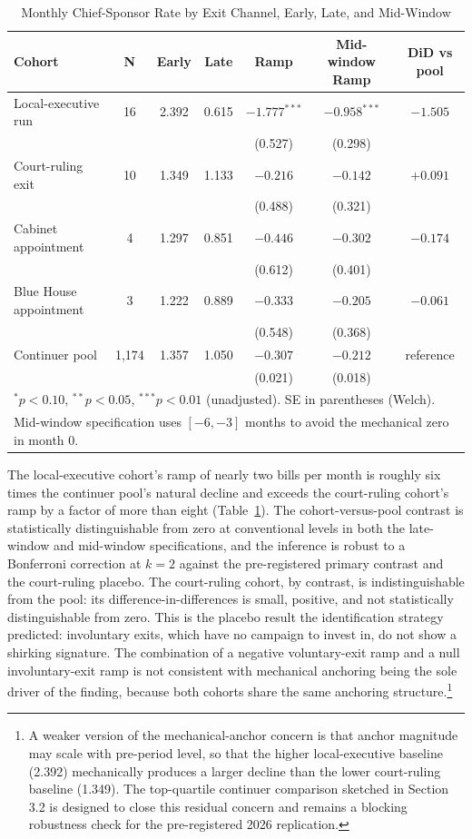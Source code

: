 \documentclass[11pt]{article}
\begin{document}
\begin{table}[H]
\centering
\caption{Monthly Chief-Sponsor Rate by Exit Channel, Early, Late, and Mid-Window}
\label{tab:main}
\begin{tabular}{lcccccc}
\toprule
Cohort & N & Early & Late & Ramp & Mid-window Ramp & DiD vs pool \\
\midrule
Local-executive run & 16 & 2.392 & 0.615 & $-1.777^{***}$ & $-0.958^{***}$ & $-1.505$ \\
 & & & & (0.527) & (0.298) & \\
Court-ruling exit & 10 & 1.349 & 1.133 & $-0.216$ & $-0.142$ & $+0.091$ \\
 & & & & (0.488) & (0.321) & \\
Cabinet appointment & 4 & 1.297 & 0.851 & $-0.446$ & $-0.302$ & $-0.174$ \\
 & & & & (0.612) & (0.401) & \\
Blue House appointment & 3 & 1.222 & 0.889 & $-0.333$ & $-0.205$ & $-0.061$ \\
 & & & & (0.548) & (0.368) & \\
\midrule
Continuer pool & 1{,}174 & 1.357 & 1.050 & $-0.307$ & $-0.212$ & reference \\
 & & & & (0.021) & (0.018) & \\
\bottomrule
\multicolumn{7}{l}{\footnotesize $^*p<0.10$, $^{**}p<0.05$, $^{***}p<0.01$ (unadjusted). SE in parentheses (Welch).} \\
\multicolumn{7}{l}{\footnotesize Mid-window specification uses $[-6,-3]$ months to avoid the mechanical zero in month 0.}
\end{tabular}
\end{table}

The local-executive cohort's ramp of nearly two bills per month is roughly six times the continuer pool's natural decline and exceeds the court-ruling cohort's ramp by a factor of more than eight (Table~\ref{tab:main}). The cohort-versus-pool contrast is statistically distinguishable from zero at conventional levels in both the late-window and mid-window specifications, and the inference is robust to a Bonferroni correction at $k=2$ against the pre-registered primary contrast and the court-ruling placebo. The court-ruling cohort, by contrast, is indistinguishable from the pool: its difference-in-differences is small, positive, and not statistically distinguishable from zero. This is the placebo result the identification strategy predicted: involuntary exits, which have no campaign to invest in, do not show a shirking signature. The combination of a negative voluntary-exit ramp and a null involuntary-exit ramp is not consistent with mechanical anchoring being the sole driver of the finding, because both cohorts share the same anchoring structure.\footnote{A weaker version of the mechanical-anchor concern is that anchor magnitude may scale with pre-period level, so that the higher local-executive baseline (2.392) mechanically produces a larger decline than the lower court-ruling baseline (1.349). The top-quartile continuer comparison sketched in Section 3.2 is designed to close this residual concern and remains a blocking robustness check for the pre-registered 2026 replication.}
\end{document}
